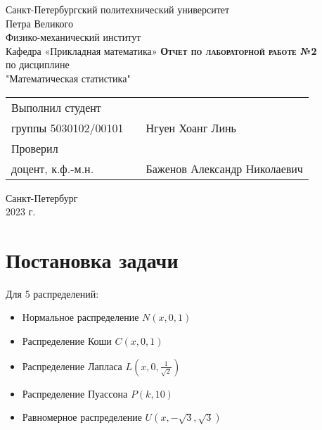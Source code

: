 \documentclass[12pt,a4paper]{article}
\begin{document}
    \begin{titlepage}
        \begin{center}
            \large
            Санкт-Петербургский политехнический университет\\Петра Великого\\
            \vspace{0.5cm}
            Физико-механический институт\\
            \vspace{0.25cm}
            Кафедра «Прикладная математика»
            \vfill
            \textsc{\LARGE\textbf{Отчет по лабораторной работе №2}}\\[5mm]
            \Large
            по дисциплине\\"Математическая статистика"
        \end{center}
        \vfill
        \begin{tabular}{l p{175pt} l}
            Выполнил студент \\ группы 5030102/00101 && Нгуен Хоанг Линь
            \vspace{0.25cm}
            \\Проверил \\ доцент, к.ф.-м.н. && Баженов Александр Николаевич
        \end{tabular}
        \vfill
        \begin{center}
            Санкт-Петербург \\ 2023 г.
        \end{center}
    \end{titlepage}

\newpage
\begin{center}
    \tableofcontents
    \setcounter{page}{2}
\end{center}
\newpage
\begin{center}
    \listoftables
\end{center}

\newpage
\section{Постановка задачи}
Для 5 распределений:
\begin{itemize}
    \item Нормальное распределение $N(x,0,1)$
    \item Распределение Коши $C(x,0,1)$
    \item Распределение Лапласа $L(x,0,\frac{1}{\sqrt{2}})$
    \item Распределение Пуассона $P(k,10)$
    \item Равномерное распределение $U(x,-\sqrt{3},\sqrt{3})$
\end{itemize}
\end{document}
